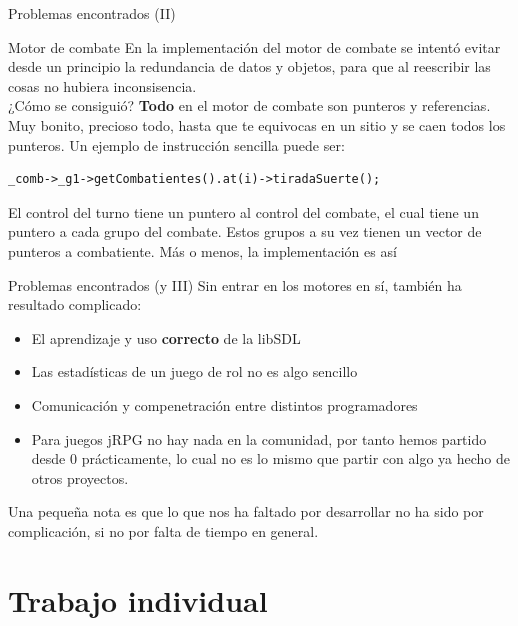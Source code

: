 \documentclass[9pt,xcolor=svgnames]{beamer}
\begin{document}
   \begin{frame}[fragile=singleslide]{Problemas encontrados (II)}
     \begin{block}{Motor de combate}
       En la implementación del motor de combate se intentó evitar desde un
       principio la redundancia de datos y objetos, para que al reescribir
       las cosas no hubiera inconsisencia.\\
       
       ¿Cómo se consiguió? \textbf{Todo} en el motor de combate son punteros
       y referencias. Muy bonito, precioso todo, hasta que te equivocas en un
       sitio y se caen todos los punteros. Un ejemplo de instrucción sencilla
       puede ser:
\begin{verbatim}
_comb->_g1->getCombatientes().at(i)->tiradaSuerte();
\end{verbatim}
       
       El control del turno tiene un puntero al control del combate, el cual
       tiene un puntero a cada grupo del combate. Estos grupos a su vez tienen
       un vector de punteros a combatiente. Más o menos, la implementación es así
     \end{block}
   \end{frame}

   \begin{frame}{Problemas encontrados (y III)}
     Sin entrar en los motores en sí, también ha resultado complicado:
     \begin{itemize}
     \item El aprendizaje y uso \textbf{correcto} de la libSDL
     \item Las estadísticas de un juego de rol no es algo sencillo
     \item Comunicación y compenetración entre distintos programadores
     \item Para juegos jRPG no hay nada en la comunidad, por tanto
       hemos partido desde 0 prácticamente, lo cual no es lo mismo
       que partir con algo ya hecho de otros proyectos.
     \end{itemize}

     Una pequeña nota es que lo que nos ha faltado por desarrollar no ha 
     sido por complicación, si no por falta de tiempo en general.
   \end{frame}
 
 \section{Trabajo individual}
\end{document}
